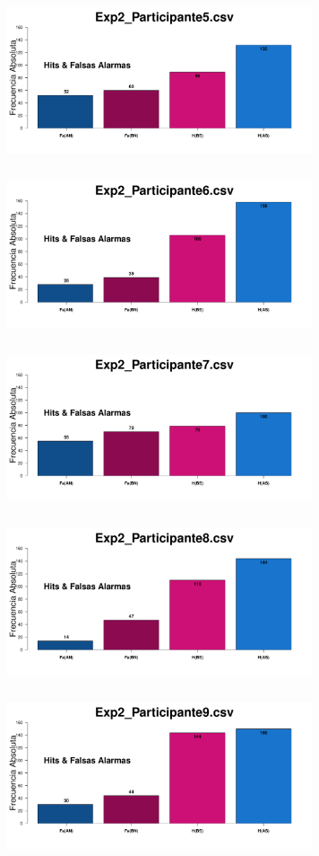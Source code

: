 \documentclass[a4paper ]{article}
\begin{document}
\begin{figure}[th]
\includegraphics[width=9cm, height=5cm]{Figures/MirrorRate_Exp2_P5} \includegraphics[width=9cm, height=5cm]{Figures/MirrorRate_Exp2_P6}
\includegraphics[width=9cm, height=5cm]{Figures/MirrorRate_Exp2_P7} \includegraphics[width=9cm, height=5cm]{Figures/MirrorRate_Exp2_P8} 
\includegraphics[width=9cm, height=5cm]{Figures/MirrorRate_Exp2_P9}
\end{figure}
\end{document}
